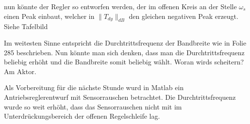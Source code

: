 \documentclass[a4paper]{article}
\begin{document}
nun könnte der Regler so entworfen werden, der im offenen Kreis an der Stelle $\omega_{s}$ einen Peak einbaut, welcher in $\|T_{dy}\|_{dB}$ den gleichen negativen Peak erzeugt.
Siehe Tafelbild

Im weitesten Sinne entspricht die Durchtrittsfrequenz der Bandbreite wie in Folie 285 beschrieben. Nun könnte man sich denken, dass man die Durchtrittsfrequenz beliebig erhöht und die Bandbreite somit beliebig wählt. Woran wirds scheitern? Am Aktor.

Als Vorbereitung für die nächste Stunde wurd in Matlab ein Antriebsreglerentwurf mit Sensorrauschen betrachtet. Die Durchtrittsfrequenz wurde so weit erhöht, dass das Sensorrauschen nicht mit im Unterdrückungsbereich der offenen Regelschleife lag. 
\end{document}
